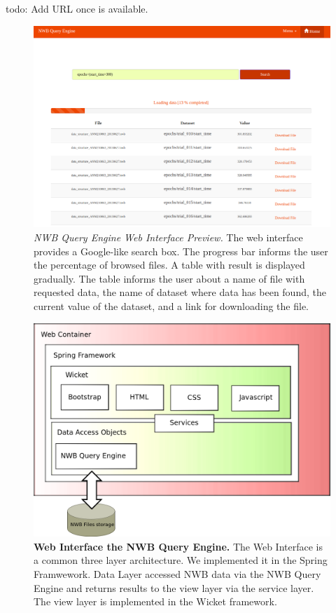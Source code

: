 \documentclass[utf8]{frontiersSCNS} %
\begin{document}
todo: Add URL once is available.

\begin{figure}
  \includegraphics[width=17cm]{nwb-query-engine-web}
\caption{\emph{NWB Query Engine Web Interface Preview.} The web interface provides a Google-like search box. The progress bar informs the user the percentage of browsed files. A table with result is displayed gradually. The table informs the user about a name of file with requested data, the name of dataset where data has been found, the current value of the dataset, and a link for downloading the file.}
\label{fig:web-interface}
\end{figure}

\begin{figure}
  \includegraphics[width=17cm]{web-interface}
\caption{\textbf{Web Interface the NWB Query Engine.} The Web Interface is a common three layer architecture. We implemented it in the Spring Framwework. Data Layer accessed NWB data via the NWB Query Engine and returns results to the view layer via the service layer. The view layer is implemented in the Wicket framework.}
\label{fig:architecture}
\end{figure}
\end{document}
